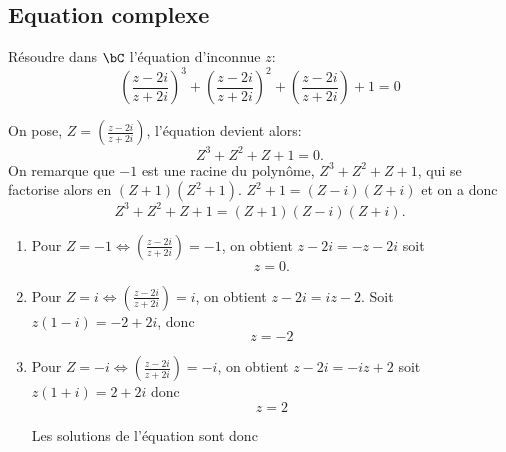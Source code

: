 \subsection{Equation complexe}
\begin{exercice}
Résoudre dans $\bC$ l'équation d'inconnue $z$: 
$$\left(\frac{z-2i}{z+2i}\right)^3+\left(\frac{z-2i}{z+2i}\right)^2+\left(\frac{z-2i}{z+2i}\right)+1=0$$
\end{exercice}


\begin{correction}
On pose, $Z =\left(\frac{z-2i}{z+2i}\right)$, l'équation devient alors: 
$$Z^3+Z^2+Z+1=0.$$
On  remarque que $-1$ est une racine du polynôme,   $Z^3+Z^2+Z+1$, qui se factorise alors en 
$(Z+1)(Z^2+1)$. $Z^2+1 =(Z-i)(Z+i)$ et on  a donc 
$$Z^3+Z^2+Z+1 =(Z+1)(Z-i)(Z+i).$$

\begin{enumerate}
\item Pour $Z=-1 \Longleftrightarrow \left(\frac{z-2i}{z+2i}\right)=-1$, on obtient 
$z-2i =-z-2i$ soit $$z=0.$$
\item Pour $Z=i \Longleftrightarrow \left(\frac{z-2i}{z+2i}\right)=i$, on obtient 
$z-2i =iz-2$. Soit $z(1-i) = -2+2i$, donc 
$$z=-2$$


\item Pour $Z=-i \Longleftrightarrow \left(\frac{z-2i}{z+2i}\right)=-i$, on obtient 
$z-2i =-iz+2$ soit $z(1+i) =2+2i$ donc 
$$z=2$$



Les solutions de l'équation sont donc 

\end{enumerate}



\end{correction}
